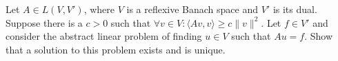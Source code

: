 Let $A\in L(V,V')$, where $V$ is a reflexive Banach space and $V'$ is
its dual. Suppose there is a $c>0$ such that $\forall v\in V:\langle
Av,v \rangle\geq c\|v\|^2$. Let $f\in V'$ and consider the abstract
linear problem of finding $u\in V$ such that $Au=f$. Show that a
solution to this problem exists and is unique.
